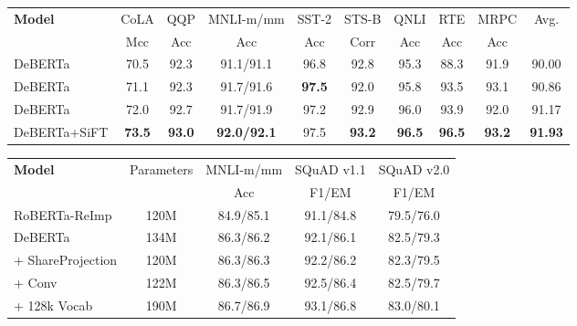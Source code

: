 \documentclass{article}
\newcommand\ModelName{DeBERTa}
\begin{document}
\begin{table*}[htb!]
    \centering
    \begin{tabular}{@{\hskip3pt}l@{\hskip2pt}|@{\hskip2pt} c@{\hskip2pt}| @{\hskip2pt}c@{\hskip2pt}|c@{\hskip2pt}|c@{\hskip2pt}|c@{\hskip2pt}|c@{\hskip2pt}|c@{\hskip2pt}|c@{\hskip2pt}|c@{\hskip2pt}}
        \toprule
        \multirow{2}{*}{\bf Model} & {CoLA} &{QQP} &{MNLI-m/mm} &SST-2 &STS-B&QNLI&RTE&MRPC& Avg.\\ 
        & Mcc & Acc & Acc & Acc &Corr&Acc&Acc&Acc\\
        \midrule
        {\ModelName} &70.5 & 92.3 & 91.1/91.1 & 96.8 & 92.8 &95.3&88.3& 91.9 &90.00\\
        {\ModelName} &71.1 & 92.3 & 91.7/91.6 & \textbf{97.5} & 92.0 & 95.8 &93.5& 93.1 &90.86\\
        {\ModelName} &72.0 & 92.7 & 91.7/91.9 & 97.2 & 92.9 &96.0 &93.9& 92.0 &91.17\\
        \hline
        {\ModelName}+SiFT &\textbf{73.5} & \textbf{93.0} & \textbf{92.0/92.1} & 97.5 & \textbf{93.2} &\textbf{96.5} &\textbf{96.5}& \textbf{93.2} &\textbf{91.93}\\
        \bottomrule
        \end{tabular}
    \caption{
    Comparison results of DeBERTa models with different sizes on the GLUE development set. 
    }
    \label{tab:xxlarge}
\end{table*}

\begin{table*}[htb!]
    \centering
    \begin{tabular}{@{\hskip1pt}l|c| c| c| c}
    \toprule
        \bf Model&Parameters &{MNLI-m/mm}& {SQuAD v1.1} &{SQuAD v2.0} \\ 
          &\ &  Acc& F1/EM & F1/EM  \\ \hline
        
        RoBERTa-ReImp & 120M & 84.9/85.1 & 91.1/84.8 &79.5/76.0  \\ 
        \hline
        DeBERTa & 134M& 86.3/86.2 &92.1/86.1 & 82.5/79.3  \\
        + ShareProjection & 120M & 86.3/86.3 &92.2/86.2 & 82.3/79.5  \\
        + Conv & 122M & 86.3/86.5 &92.5/86.4 & 82.5/79.7  \\
        + 128k Vocab & 190M & 86.7/86.9 &93.1/86.8 & 83.0/80.1  \\
       \bottomrule
        \end{tabular}
    \caption{
    Ablation study of the additional modifications in DeBERTa and DeBERTa models. Note that we progressively add each component on the top of DeBERTa\textsubscript{base}. 
    }
    \label{tab:v2}
\end{table*}
\end{document}
